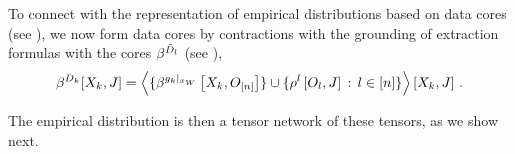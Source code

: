 To connect with the representation of empirical distributions based on data cores (see ), we now form data cores by contractions with the grounding of extraction formulas with the cores $\beta^{\tilde{D}_{l}}$ (see ),
\begin{align*}
    \beta^{D_{k}}[X_{k},J]
    = \left\langle 
        \{\beta^{{g_{k}}|_{x_{W}}}\left[X_{k},O_{[n]}\right]\}
        \cup \{ \rho^{l}\left[O_{l},J\right] \, : \, l\in[n]\}
    \right\rangle \left[ X_{k},J \right] \, .
\end{align*}

The empirical distribution is then a tensor network of these tensors, as we show next.


